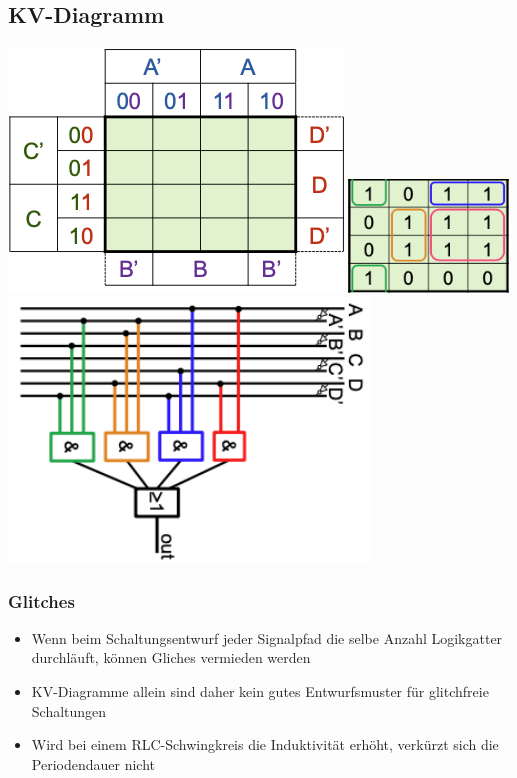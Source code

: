 \documentclass[8pt,a4paper]{scrartcl}
\begin{document}
\begin{multicols*}{3}
				\subsection{KV-Diagramm}
					\includegraphics[height=6.5cm]{img/kv1.png} 
					\includegraphics[height=3cm]{img/kv2.png} 
					\includegraphics[height=7cm]{img/kv3.png} 
				
				\subsubsection{Glitches}
					\begin{itemize}\itemsep0pt
						\item Wenn beim Schaltungsentwurf jeder Signalpfad die selbe Anzahl Logikgatter durchläuft, können Gliches vermieden werden
						\item KV-Diagramme allein sind daher kein gutes Entwurfsmuster für glitchfreie Schaltungen
						\item Wird bei einem RLC-Schwingkreis die Induktivität erhöht, verkürzt sich die Periodendauer nicht
					\end{itemize}



\end{multicols*}
\end{document}
